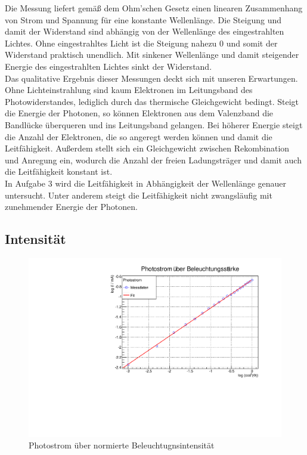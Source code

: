 Die Messung liefert gemäß dem Ohm'schen Gesetz einen linearen Zusammenhang von Strom und Spannung für eine konstante Wellenlänge. Die Steigung und damit der Widerstand sind abhängig von der Wellenlänge des eingestrahlten Lichtes. Ohne eingestrahltes Licht ist die Steigung nahezu 0 und somit der Widerstand praktisch unendlich. Mit sinkener Wellenlänge und damit steigender Energie des eingestrahlten Lichtes sinkt der Widerstand. \\
Das qualitative Ergebnis dieser Messungen deckt sich mit unseren Erwartungen. Ohne Lichteinstrahlung sind kaum Elektronen im Leitungsband des Photowiderstandes, lediglich durch das thermische Gleichgewicht bedingt. Steigt die Energie der Photonen, so können Elektronen aus dem Valenzband die Bandlücke überqueren und ins Leitungsband gelangen. Bei höherer Energie steigt die Anzahl der Elektronen, die so angeregt werden können und damit die Leitfähigkeit. Außerdem stellt sich ein Gleichgewicht zwischen Rekombination und Anregung ein, wodurch die Anzahl der freien Ladungsträger und damit auch die Leitfähigkeit konstant ist. \\
In Aufgabe 3 wird die Leitfähigkeit in Abhängigkeit der Wellenlänge genauer untersucht. Unter anderem steigt die Leitfähigkeit nicht zwangsläufig mit zunehmender Energie der Photonen. \\

\subsection{Intensität}
\begin{figure}
\label{A2_log}
\centering
\includegraphics[scale=0.5]{../A2/A2_log.pdf}
\caption{Photostrom über normierte Beleuchtugnsintensität}
\end{figure}

